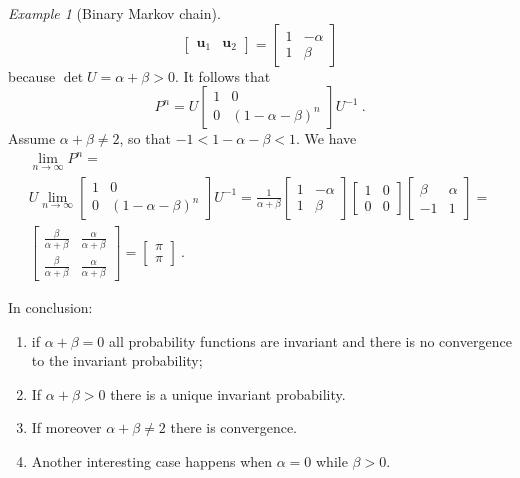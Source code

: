 \documentclass[12pt,a4paper]{amsart}
\theoremstyle{plain}%
\theoremstyle{definition}
\theoremstyle{remark}
\newtheorem{example}{Example}
\begin{document}
\begin{example}[Binary Markov chain]
\begin{equation*}
  \begin{bmatrix}
    \bm u_1 & \bm u_2
  \end{bmatrix}
=
  \begin{bmatrix}
    1 & -\alpha \\
    1 & \beta \end{bmatrix}
\end{equation*}
because $\det U = \alpha+\beta > 0$. It follows that
\begin{equation*}
  P^n = U \begin{bmatrix} 1 & 0 \\ 0 & (1-\alpha-\beta)^n
  \end{bmatrix} U^{-1} \ .
\end{equation*}
Assume $\alpha+\beta\neq 2$, so that $-1 < 1-\alpha-\beta < 1$. We have
\begin{multline*}
  \lim_{n\to\infty} P^n = \\ U \lim_{n\to\infty} \begin{bmatrix} 1 & 0 \\ 0 & (1-\alpha-\beta)^n
  \end{bmatrix}U^{-1}  = \frac1{\alpha+\beta} 
\begin{bmatrix}
    1 & -\alpha \\
    1 & \beta \end{bmatrix}
  \begin{bmatrix} 1 & 0 \\ 0 & 0 
  \end{bmatrix}
  \begin{bmatrix}
    \beta & \alpha \\ -1 & 1
  \end{bmatrix} = \\ 
  \begin{bmatrix}
    \frac{\beta}{\alpha+\beta} & \frac{\alpha}{\alpha+\beta} \\ \frac{\beta}{\alpha+\beta} & \frac{\alpha}{\alpha+\beta}
  \end{bmatrix} = 
  \begin{bmatrix}
    \pi \\ \pi 
  \end{bmatrix}
\ .
\end{multline*}

In conclusion: 
\begin{enumerate}
    \item 
if $\alpha+\beta = 0$ all probability functions are invariant and there is no convergence to the invariant probability; 
\item If $\alpha+\beta > 0$ there is a unique invariant probability. 
\item If moreover $\alpha+\beta \neq 2$ there is convergence. \item Another interesting case happens when $\alpha=0$ while $\beta > 0$. 
\end{enumerate} 


\end{example}
\end{document}
